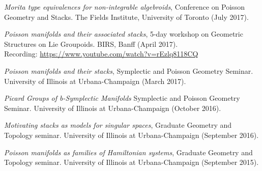 \documentclass[margin,line,pifont,palatino,courier]{res}
\begin{document}
\begin{resume}
\emph{Morita type equivalences for non-integrable algebroids}, Conference on Poisson Geometry and Stacks. The Fields Institute, University of Toronto (July 2017).

\emph{Poisson manifolds and their associated stacks}, 5-day workshop on Geometric Structures on Lie Groupoids. BIRS, Banff (April 2017).\\
Recording: \url{https://www.youtube.com/watch?v=rEzlq8118CQ}

\emph{Poisson manifolds and their stacks}, Symplectic and Poisson Geometry Seminar. University of Illinois at Urbana-Champaign (March 2017).

\emph{Picard Groups of b-Symplectic Manifolds} Symplectic and Poisson Geometry Seminar. University of Illinois at Urbana-Champaign (October 2016).

\emph{Motivating stacks as models for singular spaces}, Graduate Geometry and Topology seminar. University of Illinois at Urbana-Champaign (September 2016).

\emph{Poisson manifolds as families of Hamiltonian systems}, Graduate Geometry and Topology seminar. University of Illinois at Urbana-Champaign (September 2015).



\end{resume}
\end{document}

